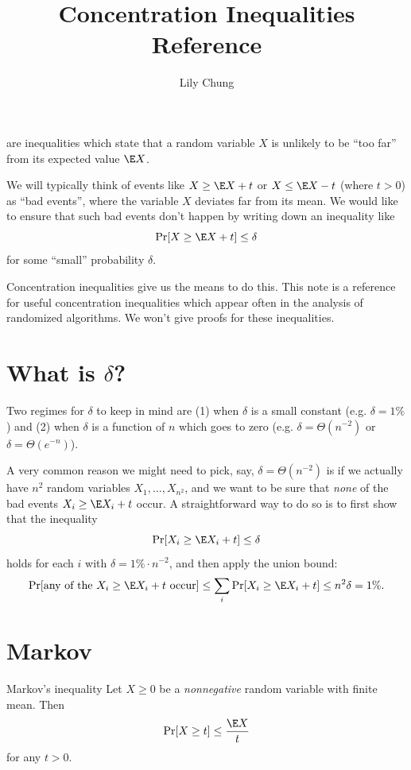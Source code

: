 \documentclass[11pt,a4paper]{article}
\title{Concentration Inequalities Reference}
\author{Lily Chung}
\date{}
\begin{document}
\maketitle

 are inequalities which state that a random variable $X$ is unlikely to be ``too far'' from its expected value $\E X$.

We will typically think of events like $X \ge \E X + t$ or $X \le \E X - t$ (where $t > 0$) as ``bad events'', where the variable $X$ deviates far from its mean.  We would like to ensure that such bad events don't happen by writing down an inequality like
\[\Pr[X \ge \E X + t] \le \delta\]
for some ``small'' probability $\delta$.

Concentration inequalities give us the means to do this.
This note is a reference for useful concentration inequalities which appear often in the analysis of randomized algorithms.
We won't give proofs for these inequalities.

\section*{What is $\delta$?}

Two regimes for $\delta$ to keep in mind are (1) when $\delta$ is a small constant (e.g. $\delta = 1\%$) and (2) when $\delta$ is a function of $n$ which goes to zero (e.g. $\delta = \Theta(n^{-2})$ or $\delta = \Theta(e^{-n})$).

A very common reason we might need to pick, say, $\delta = \Theta(n^{-2})$
is if we actually have $n^2$ random variables $X_1, \dots, X_{n^2}$, and we want to be sure that \emph{none} of the bad events $X_i \ge \E X_i + t$ occur.
A straightforward way to do so is to first show that the inequality
\[\Pr[X_i \ge \E X_i + t] \le \delta\]
holds for each $i$ with $\delta = 1\% \cdot n^{-2}$, and then apply the union bound:
\[\Pr[\text{any of the $X_i \ge \E X_i + t$ occur}] \le \sum_i \Pr[X_i \ge \E X_i + t] \le n^2 \delta = 1\%.\]

\section*{Markov}

\begin{thmbox}[label=thm:markov]{Markov's inequality}
  Let $X \ge 0$ be a \emph{nonnegative} random variable with finite mean.
  Then
  \[\Pr[X \ge t] \le \frac{\E X}{t}\]
  for any $t > 0$.
\end{thmbox}

\end{document}
